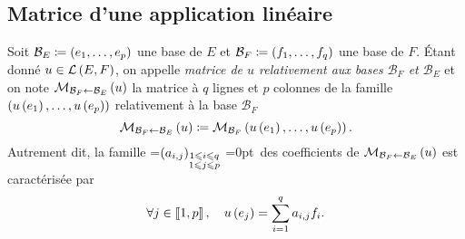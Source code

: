 \documentclass{magnolia}
\begin{document}
\subsection{Matrice d'une application linéaire}

\begin{definition}[utile=-3]
Soit $\mathcal{B}_E\coloneqq(e_1,\ldots,e_p)$ une base de $E$ et
$\mathcal{B}_F\coloneqq(f_1,\ldots,f_q)$ une base de $F$. Étant donné $u\in\mathcal{L}\left(E,F\right)$, on
appelle \emph{matrice de $u$ relativement aux bases $\mathcal{B}_F$ et $\mathcal{B}_E$} et
on note $\mathcal{M}_{\mathcal{B}_F\gets\mathcal{B}_E}\left(u\right)$ la matrice à $q$ lignes et $p$
colonnes de la famille $(u\left(e_1\right),\ldots,u\left(e_p\right))$ relativement à la base
$\mathcal{B}_F$
\[\mathcal{M}_{\mathcal{B}_F\gets\mathcal{B}_E}\left(u\right)\coloneqq
  \mathcal{M}_{\mathcal{B}_F}\left(u\left(e_1\right),\ldots,u\left(e_p\right)\right).\]
Autrement dit, la famille
=\hbox{$\left(a_{i,j}\right)_{\substack{1\leqslant i\leqslant q\\ 1\leqslant j \leqslant p}}$}
=0pt\ des coefficients de
$\mathcal{M}_{\mathcal{B}_F\gets\mathcal{B}_E}\left(u\right)$ est caractérisée par
\[\forall j\in\left\llbracket 1,p\right\rrbracket ,\quad u\left(e_j\right)=\sum_{i=1}^q a_{i,j}f_i.\]
\end{definition}
\end{document}

